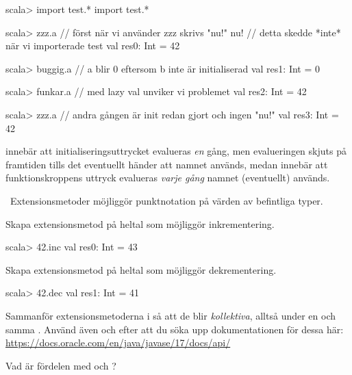 \SubtaskSolved
\begin{REPL}
scala> import test.*
import test.*

scala> zzz.a      // först när vi använder zzz skrivs "nu!"
nu!               // detta skedde *inte* när vi importerade test
val res0: Int = 42

scala> buggig.a   // a blir 0 eftersom b inte är initialiserad
val res1: Int = 0

scala> funkar.a   // med lazy val unviker vi problemet
val res2: Int = 42


scala> zzz.a     // andra gången är init redan gjort och ingen "nu!"
val res3: Int = 42
\end{REPL}

\SubtaskSolved {} innebär att initialiseringsuttrycket evalueras \emph{en} gång, men evalueringen skjuts på framtiden tills det eventuellt händer att namnet  används, medan  innebär att funktionskroppens uttryck evalueras \emph{varje gång} namnet  (eventuellt) används.


\QUESTEND




\QUESTBEGIN

\Task \what~Extensionsmetoder möjliggör punktnotation på värden av befintliga typer.

\Subtask Skapa extensionsmetod på heltal som möjliggör inkrementering. 
\begin{REPLnonum}
scala> 42.inc
val res0: Int = 43
\end{REPLnonum} 

\Subtask Skapa extensionsmetod på heltal som möjliggör dekrementering.
\begin{REPLnonum}
scala> 42.dec
val res1: Int = 41
\end{REPLnonum}

\Subtask Sammanför extensionsmetoderna i så att de blir \emph{kollektiva}, alltså under en och samma . Använd även  och  efter att du söka upp dokumentationen för dessa här: \url{https://docs.oracle.com/en/java/javase/17/docs/api/}

\Subtask Vad är fördelen med   och ?



\SOLUTION

\TaskSolved \what~

